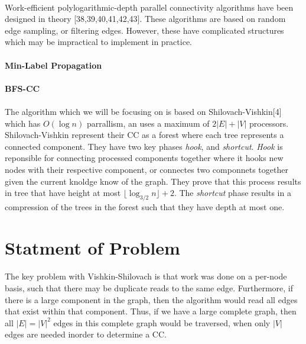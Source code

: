 \documentclass[]{article}
\begin{document}
 \paragraph{}
 Work-efficient polylogarithmic-depth parallel connectivity algorithms have been designed in theory [38,39,40,41,42,43]. These algorithms are based on random edge sampling, or filtering edges. However, these have complicated structures which may be impractical to implement in practice. 
 
 \paragraph{Min-Label Propagation}
 \paragraph{BFS-CC}
 
 \paragraph{}
The algorithm which we will be focusing on is based on Shilovach-Vishkin[4] which has $O(\log n)$ parrallism, an uses a maximum of $2|E| + |V|$ processors. Shilovach-Vishkin represent their CC as a forest where each tree represents a connected component. They have two key phases \textit{hook}, and \textit{shortcut}. \textit{Hook} is reponsible for connecting processed components together where it hooks new nodes with their respective component, or connectes two componnets together given the current knoldge know of the graph. They prove that this process results in tree that have height at most $\lfloor\log_{3/2}n\rfloor + 2$. The \textit{shortcut} phase results in a compression of the trees in the forest such that they have depth at most one. 


 
 \section{Statment of Problem}
\paragraph{}
The key problem with Vishkin-Shilovach is that work was done on a per-node basis, such that there may be duplicate reads to the same edge. Furthermore, if there is a large component in the graph, then the algorithm would read all edges that exist within that component. Thus, if we have a large complete graph, then all $|E|=|V|^2$ edges in this complete graph would be traversed, when only $|V|$ edges are needed inorder to determine a CC.
\end{document}
